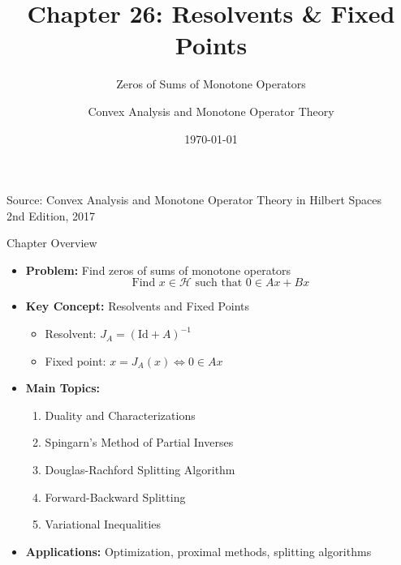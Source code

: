 \documentclass[aspectratio=169,10pt]{beamer}
\title{Chapter 26: Resolvents \& Fixed Points}
\subtitle{Zeros of Sums of Monotone Operators}
\author{Convex Analysis and Monotone Operator Theory}
\date{\today}
\begin{document}

\begin{frame}
  \titlepage
  \vspace{-1cm}
  \begin{center}
    \footnotesize
    Source: Convex Analysis and Monotone Operator Theory in Hilbert Spaces \\
     2nd Edition, 2017
  \end{center}
\end{frame}


\begin{frame}{Chapter Overview}
  \begin{itemize}
    \item \textbf{Problem:} Find zeros of sums of monotone operators
      \[ \text{Find } x \in \mathcal{H} \text{ such that } 0 \in Ax + Bx \]

    \vspace{0.3cm}
    \item \textbf{Key Concept:} Resolvents and Fixed Points
      \begin{itemize}
        \item Resolvent: $J_A = (\text{Id} + A)^{-1}$
        \item Fixed point: $x = J_A(x) \Leftrightarrow 0 \in Ax$
      \end{itemize}

    \vspace{0.3cm}
    \item \textbf{Main Topics:}
      \begin{enumerate}
        \item Duality and Characterizations
        \item Spingarn's Method of Partial Inverses
        \item Douglas-Rachford Splitting Algorithm
        \item Forward-Backward Splitting
        \item Variational Inequalities
      \end{enumerate}

    \vspace{0.3cm}
    \item \textbf{Applications:} Optimization, proximal methods, splitting algorithms
  \end{itemize}
\end{frame}
\end{document}
